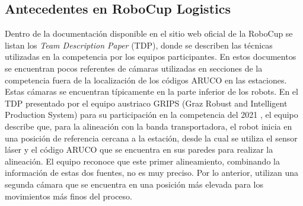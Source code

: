 \subsection{Antecedentes en RoboCup Logistics}
Dentro de la documentación disponible en el sitio web oficial de la RoboCup se listan los \textit{Team Description Paper} (TDP), donde se describen las técnicas utilizadas en la competencia por los equipos participantes. En estos documentos se encuentran pocos referentes de cámaras utilizadas en secciones de la competencia fuera de la localización de los códigos ARUCO en las estaciones. Estas cámaras se encuentran típicamente en la parte inferior de los robots. En el TDP presentado por el equipo austriaco GRIPS (Graz Robust and Intelligent Production System) para su participación en la competencia del 2021 \cite{furbaß_robocup_2021}, el equipo describe que, para la alineación con la banda transportadora, el robot inicia en una posición de referencia cercana a la estación, desde la cual se utiliza el sensor láser y el código ARUCO que se encuentra en sus paredes para realizar la alineación. El equipo reconoce que este primer alineamiento, combinando la información de estas dos fuentes, no es muy preciso. Por lo anterior, utilizan una segunda cámara que se encuentra en una posición más elevada para los movimientos más finos del proceso. 

